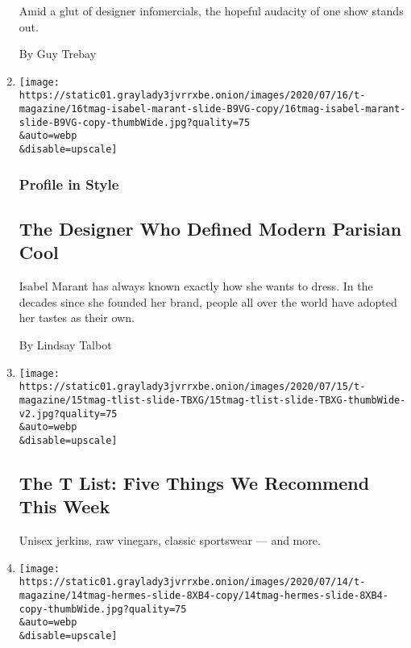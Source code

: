 \begin{enumerate}
  Amid a glut of designer infomercials, the hopeful audacity of one show
  stands out.

  By Guy Trebay
\item
  \href{/2020/07/16/t-magazine/isabel-marant.html}{}

  \texttt{[image: https://static01.graylady3jvrrxbe.onion/images/2020/07/16/t-magazine/16tmag-isabel-marant-slide-B9VG-copy/16tmag-isabel-marant-slide-B9VG-copy-thumbWide.jpg?quality=75\\\&auto=webp\\\&disable=upscale]}

  \hypertarget{profile-in-style}{%
  \subsubsection{Profile in Style}\label{profile-in-style}}

  \hypertarget{the-designer-who-defined-modern-parisian-cool}{%
  \subsection{The Designer Who Defined Modern Parisian
  Cool}\label{the-designer-who-defined-modern-parisian-cool}}

  Isabel Marant has always known exactly how she wants to dress. In the
  decades since she founded her brand, people all over the world have
  adopted her tastes as their own.

  By Lindsay Talbot
\item
  \href{/2020/07/16/t-magazine/margo-price-album-tlist.html}{}

  \texttt{[image: https://static01.graylady3jvrrxbe.onion/images/2020/07/15/t-magazine/15tmag-tlist-slide-TBXG/15tmag-tlist-slide-TBXG-thumbWide-v2.jpg?quality=75\\\&auto=webp\\\&disable=upscale]}

  \hypertarget{the-t-list-five-things-we-recommend-this-week-1}{%
  \subsection{The T List: Five Things We Recommend This
  Week}\label{the-t-list-five-things-we-recommend-this-week-1}}

  Unisex jerkins, raw vinegars, classic sportswear --- and more.
\item
  \href{/2020/07/15/t-magazine/hermes-fashion-savoir-faire.html}{}

  \texttt{[image: https://static01.graylady3jvrrxbe.onion/images/2020/07/14/t-magazine/14tmag-hermes-slide-8XB4-copy/14tmag-hermes-slide-8XB4-copy-thumbWide.jpg?quality=75\\\&auto=webp\\\&disable=upscale]}


\end{enumerate}
